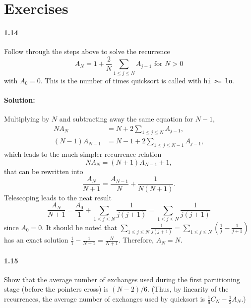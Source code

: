 \documentclass{article}
\begin{document}
\section*{Exercises}

\paragraph{1.14} Follow through the steps above to solve the recurrence
\begin{equation*}
  A_N = 1 + \frac{2}{N}\sum_{1 \leq j \leq N}A_{j - 1} \text{ for } N > 0
\end{equation*} with $A_0 = 0$. This is the number of times quicksort is called
with \verb|hi >= lo|.

\paragraph{Solution:} Multiplying by $N$ and subtracting away the same equation
for $N - 1$, \begin{align*}
  NA_N &= N + 2\sum_{1 \leq j \leq N}A_{j - 1}, \\
  (N - 1)A_{N - 1} &= N - 1 + 2\sum_{1 \leq j \leq N - 1}A_{j - 1},
\end{align*} which leads to the much simpler recurrence relation
\begin{equation*}
  NA_N = (N + 1)A_{N - 1} + 1,
\end{equation*} that can be rewritten into \begin{equation*}
  \frac{A_N}{N + 1} = \frac{A_{N - 1}}{N} + \frac{1}{N(N + 1)}.
\end{equation*} Telescoping leads to the neat result \begin{equation*}
  \frac{A_N}{N + 1} = \frac{A_0}{1} + \sum_{1 \leq j \leq N}\frac{1}{j(j + 1)}
    = \sum_{1 \leq j \leq N}\frac{1}{j(j + 1)}
\end{equation*} since $A_0 = 0$. It should be noted that $\sum_{1 \leq j \leq
N}\frac{1}{j(j + 1)} = \sum_{1 \leq j \leq N}\left(\frac{1}{j} - \frac{1}{j +
1}\right)$ has an exact solution $\frac{1}{1} - \frac{1}{N + 1} = \frac{N}{N +
1}$. Therefore, $A_N = N$.

\paragraph{1.15} Show that the average number of exchanges used during the
first partitioning stage (before the pointers cross) is $(N - 2)/6$. (Thus, by
linearity of the recurrences, the average number of exchanges used by quicksort
is $\frac{1}{6}C_N - \frac{1}{2}A_N$.)
\end{document}
